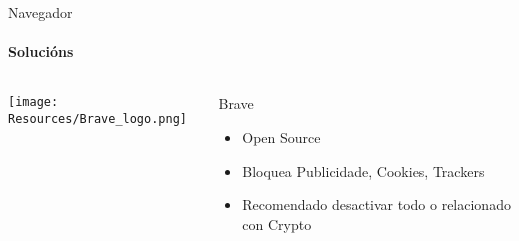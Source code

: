 \documentclass{beamer}
\begin{document}



\begin{frame}{Navegador}
  \framesubtitle{Solucións}

  \begin{columns}
    \begin{column}{0.5\textwidth}
      \texttt{[image: Resources/Brave\_logo.png]}

      \vspace{1cm}


    \end{column}

    \begin{column}{0.4\textwidth}
      \begin{block}{Brave}
        \begin{itemize}
          \item Open Source
          \item Bloquea Publicidade, Cookies, Trackers
          \item Recomendado desactivar todo o relacionado con Crypto
        \end{itemize}
      \end{block}

    \end{column}

  \end{columns}

\end{frame}


\end{document}
